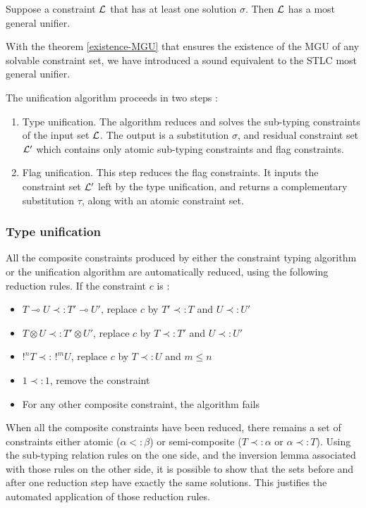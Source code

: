 \begin{thm}
	\label{existence-MGU}
	Suppose a constraint $\mathcal{L}$ that has at least one solution $\sigma$. Then $\mathcal{L}$ has a most general unifier.
\end{thm}
With the theorem \ref{existence-MGU} that ensures the existence of the MGU of any solvable constraint set, we have introduced a sound
equivalent to the STLC most general unifier.

The unification algorithm proceeds in two steps :
	\begin{enumerate}
		\item Type unification. The algorithm reduces and solves the sub-typing constraints of the input set $\mathcal{L}$.
			The output is a substitution $\sigma$, and residual constraint set $\mathcal{L}'$ which contains only atomic sub-typing constraints and
			flag constraints.
			
		\item Flag unification. This step reduces the flag constraints. It inputs the constraint set $\mathcal{L}'$ left by the type unification,
			and returns a complementary substitution $\tau$, along with an atomic constraint set.
	\end{enumerate}

\subsubsection{Type unification}

\begin{defn}
	All the composite constraints produced by either the constraint typing
  algorithm or the unification algorithm are automatically reduced, using the following reduction rules.
  If the constraint $c$ is :
  	\begin{itemize}
      \item $T \multimap U \prec: T' \multimap U'$, replace $c$ by $T' \prec: T$ and $U \prec: U'$
      \item $T \otimes U \prec: T' \otimes U'$, replace $c$ by $T \prec: T'$ and $U \prec: U'$
      \item $!^n T \prec: \, !^m U$, replace $c$ by $T \prec: U$ and $m \le n$
      \item $1 \prec: 1$, remove the constraint
      \item For any other composite constraint, the algorithm fails
    \end{itemize}
  When all the composite constraints have been reduced, there remains a set of constraints either atomic ($\alpha <: \beta$) or
  semi-composite ($T \prec: \alpha$ or $\alpha \prec: T$).
	Using the sub-typing relation rules on the one side, and the inversion lemma associated with those rules on the other side,
	it is possible to show that the sets before and after one reduction step have exactly the same solutions. This justifies
	the automated application of those reduction rules.
\end{defn}

